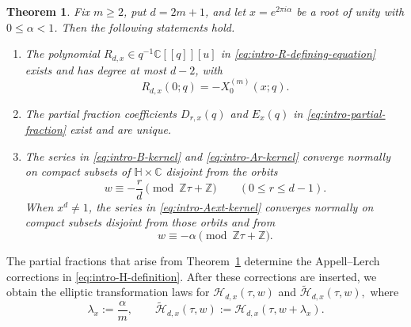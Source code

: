 \documentclass[12pt]{amsart}
\numberwithin{equation}{section}
\newtheorem{theorem}{Theorem}[section]
\newcommand{\CC}{\mathbb C}
\newcommand{\HH}{\mathbb H}
\newcommand{\ZZ}{\mathbb Z}
\begin{document}
\begin{theorem}%
\label{thm:intro-defect}
Fix \(m\geq2\), put \(d=2m+1\), and let \(x=e^{2\pi i\alpha}\) be a root of
unity with \(0\leq\alpha<1\).  Then the following statements hold.
\begin{enumerate}[label=\textnormal{(\roman*)},leftmargin=*]
\item The polynomial \(R_{d,x}\in q^{-1}\CC[[q]][u]\) in
\eqref{eq:intro-R-defining-equation} exists and has degree at most \(d-2\),
with
\[
R_{d,x}(0;q)=-X_0^{(m)}(x;q).
\]

\item The partial fraction coefficients \(D_{r,x}(q)\) and \(E_x(q)\) in
\eqref{eq:intro-partial-fraction} exist and are unique. 

\item The series in \eqref{eq:intro-B-kernel} and
\eqref{eq:intro-Ar-kernel} converge normally on compact subsets of
\(\HH\times\CC\) disjoint from the orbits
\[
w\equiv -\frac rd \pmod{\ZZ\tau+\ZZ}
\qquad(0\leq r\leq d-1).
\]
When \(x^d\neq1\), the series in \eqref{eq:intro-Aext-kernel} converges
normally on compact subsets disjoint from those orbits and from
\[
w\equiv -\alpha \pmod{\ZZ\tau+\ZZ}.
\]
\end{enumerate}
\end{theorem}

The partial fractions that arise from Theorem~\ref{thm:intro-defect} determine the
Appell--Lerch corrections in \eqref{eq:intro-H-definition}.  After these
corrections are inserted, we obtain the elliptic transformation laws for $\mathcal{H}_{d,x}(\tau,w)$ and $\widetilde{\mathcal{H}}_{d,x}(\tau,w),$  where 
\begin{equation}\label{eq:intro-translation-new}
\lambda_x:=\frac{\alpha}{m},
\qquad
\widetilde{\mathcal H}_{d,x}(\tau,w):=
\mathcal H_{d,x}(\tau,w+\lambda_x).
\end{equation}
\end{document}
